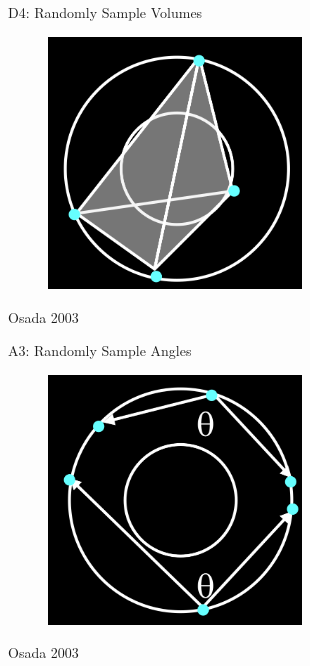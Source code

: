 \documentclass{beamer}
\begin{document}
\begin{frame}{D4: Randomly Sample Volumes}

\begin{figure}[t]
	\centering
    \includegraphics[width=0.6\textwidth]{D4.png}
\end{figure}

\small Osada 2003

\end{frame}

\begin{frame}{A3: Randomly Sample Angles}

\begin{figure}[t]
	\centering
    \includegraphics[width=0.6\textwidth]{A3.png}
\end{figure}

\small Osada 2003

\end{frame}
\end{document}
